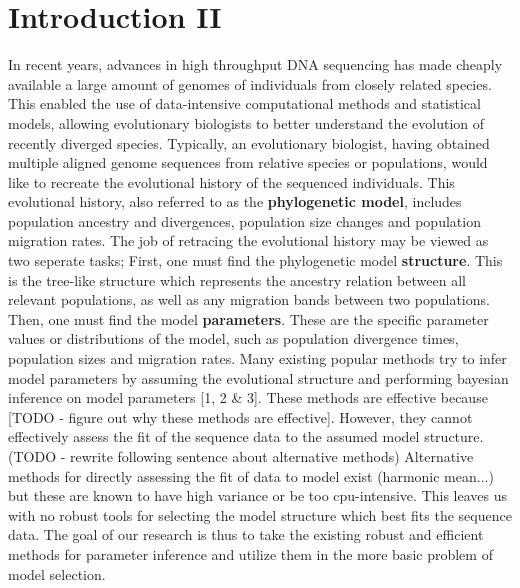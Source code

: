 \documentclass[11pt]{article}
\newcommand{\1}{\mathbbm{1}}
\begin{document}
\newpage

\tableofcontents

\newpage
















\section{Introduction II}

In recent years, advances in high throughput DNA sequencing has made cheaply available a large amount of genomes of individuals from closely related species. This enabled the use of data-intensive computational methods and statistical models, allowing evolutionary biologists to better understand the evolution of recently diverged species.
%
Typically, an evolutionary biologist, having obtained multiple aligned genome sequences from relative species or populations, would like to recreate the evolutional history of the sequenced individuals. This evolutional history, also referred to as the \textbf{phylogenetic model}, includes population ancestry and divergences, population size changes and population migration rates.
%
The job of retracing the evolutional history may be viewed as two seperate tasks; First, one must find the phylogenetic model \textbf{structure}. This is the tree-like structure which represents the ancestry relation between all relevant populations, as well as any migration bands between two populations. Then, one must find the model \textbf{parameters}. These are the specific parameter values or distributions of the model, such as population divergence times, population sizes and migration rates.
%
Many existing popular methods try to infer model parameters by assuming the evolutional structure  and performing bayesian inference on model parameters [1, 2 \& 3]. These methods are effective because [TODO - figure out why these methods are effective]. However, they cannot effectively assess the fit of the sequence data to the assumed model structure.
%
(TODO - rewrite following sentence about alternative methods) Alternative methods for directly assessing the fit of data to model exist (harmonic mean...) but these are known to have high variance or be too cpu-intensive.
%
This leaves us with no robust tools for selecting the model structure which best fits the sequence data.
%
The goal of our research is thus to take the existing robust and efficient methods for parameter inference and utilize them in the more basic problem of model selection.
%
\end{document}
